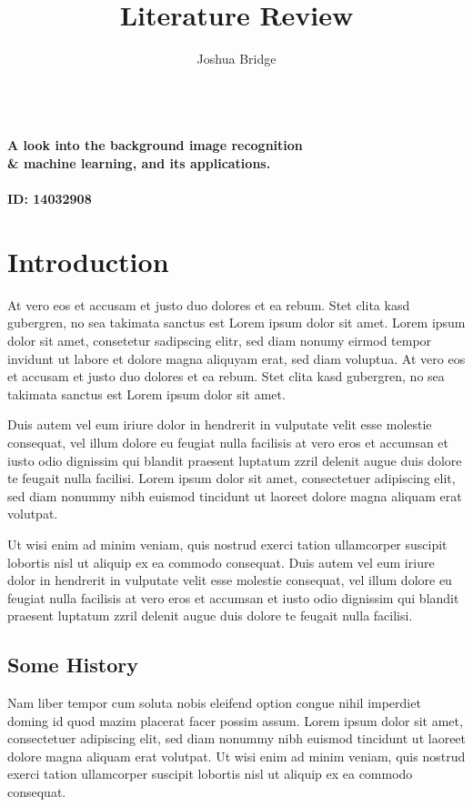 \documentclass[12pt,a4paper]{report}
\title{Literature Review}
\author{Joshua Bridge}
\begin{document}
\makeatletter
\begin{titlepage}
	\centering
	\vspace*{15\baselineskip}
	\huge
	\bfseries
	\@title\\[1\baselineskip]
	\normalfont
	\small
	A look into the background image recognition \\
	\& machine learning, and its applications. \\[2\baselineskip]
	\@author\space \\
	ID: 14032908
\end{titlepage}
\makeatother

\section{Introduction}

At vero eos et accusam et justo duo dolores et ea rebum. Stet clita kasd gubergren, no sea takimata sanctus est Lorem ipsum dolor sit amet. Lorem ipsum dolor sit amet, consetetur sadipscing elitr, sed diam nonumy eirmod tempor invidunt ut labore et dolore magna aliquyam erat, sed diam voluptua. At vero eos et accusam et justo duo dolores et ea rebum. Stet clita kasd gubergren, no sea takimata sanctus est Lorem ipsum dolor sit amet.

Duis autem vel eum iriure dolor in hendrerit in vulputate velit esse molestie consequat, vel illum dolore eu feugiat nulla facilisis at vero eros et accumsan et iusto odio dignissim qui blandit praesent luptatum zzril delenit augue duis dolore te feugait nulla facilisi. Lorem ipsum dolor sit amet, consectetuer adipiscing elit, sed diam nonummy nibh euismod tincidunt ut laoreet dolore magna aliquam erat volutpat.

Ut wisi enim ad minim veniam, quis nostrud exerci tation ullamcorper suscipit lobortis nisl ut aliquip ex ea commodo consequat. Duis autem vel eum iriure dolor in hendrerit in vulputate velit esse molestie consequat, vel illum dolore eu feugiat nulla facilisis at vero eros et accumsan et iusto odio dignissim qui blandit praesent luptatum zzril delenit augue duis dolore te feugait nulla facilisi.

\subsection{Some History}

Nam liber tempor cum soluta nobis eleifend option congue nihil imperdiet doming id quod mazim placerat facer possim assum. Lorem ipsum dolor sit amet, consectetuer adipiscing elit, sed diam nonummy nibh euismod tincidunt ut laoreet dolore magna aliquam erat volutpat. Ut wisi enim ad minim veniam, quis nostrud exerci tation ullamcorper suscipit lobortis nisl ut aliquip ex ea commodo consequat.




\end{document}
